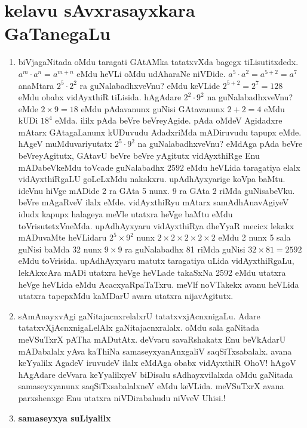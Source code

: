 \chapter{kelavu sAvxrasayxkara GaTanegaLu}

\begin{enumerate}[\rm 1)]
\item biVjagaNitada oMdu taragati GAtAMka tatatxvXda bagegx tiLisutitxdedx. $a^m\cdot a^n=a^{m+n}$ eMdu heVLi oMdu udAharaNe niVDide. $a^5\cdot a^2=a^{5+2}=a^7$ anaMtara $2^5\cdot 2^2$ ra guNalabadhxveVnu? eMdu keVLide $2^{5+2}=2^7=128$ eMdu obabx vidAyxthiR tiLisida. hAgAdare $2^2\cdot 9^2$ na guNalabadhxveVnu? eMde $2\times 9=18$ eMdu pAdavanunx guNisi GAtavanunx $2+2=4$ eMdu kUDi $18^4$ eMda. ililx pAda beVre beVreyAgide. pAda oMdeV Agidadxre mAtarx GAtagaLanunx kUDuvudu AdadxriMda mADiruvudu tapupx eMde. hAgeV muMduvariyutatx $2^5\cdot 9^2$ na guNalabadhxveVnu? eMdAga pAda beVre beVreyAgitutx, GAtavU beVre beVre yAgitutx vidAyxthiRge Enu mADabeVkeMdu toVcade guNalabadhx $2592$ eMdu heVLida taragatiya elalx vidAyxthiRgaLU goLeLxMdu nakakxru. upAdhAyxyarige koVpa baMtu. ideVnu hiVge mADide {\rm 2} ra GAta {\rm 5} nunx. {\rm 9} ra GAta {\rm 2} riMda guNisabeVku. beVre mAgaRveV ilalx eMde. vidAyxthiRyu mAtarx samAdhAnavAgiyeV idudx kapupx halageya meVle utatxra heVge baMtu eMdu toVrisutetxVneMda. upAdhAyxyaru vidAyxthiRya dheYyaR mecicx lekakx mADuvaMte heVLidaru $2^5\times 9^2$ nunx $2\times 2\times 2\times 2\times 2$ eMdu {\rm 2} nunx {\rm 5} sala guNisi baMda {\rm 32} nunx $9\times 9$ ra guNalabadhx {\rm 81} riMda guNisi $32\times 81=2592$ eMdu toVrisida. upAdhAyxyaru matutx taragatiya uLida vidAyxthiRgaLu, lekAkxcAra mADi utatxra heVge heVLade takaSxNa {\rm 2592} eMdu utatxra heVge heVLida eMdu AcacxyaRpaTaTxru. meVlf noVTakekx avanu heVLida utatxra tapepxMdu kaMDarU avara utatxra nijavAgitutx.

\item sAmAnayxvAgi gaNitajacnxrelalxrU tatatxvxjAcnxnigaLu. Adare tatatxvXjAcnxnigaLelAlx gaNitajacnxralalx. oMdu sala gaNitada meVSuTxrX pATha mADutAtx. deVvaru savaRshakatx Enu beVkAdarU mADabalalx yAva kaThiNa samaseyxyanAnxgaliV saqSiTxsabalalx. avana keYyalilx AgadeV iruvudeV ilalx eMdAga obabx vidAyxthiR OhoV! hAgoV hAgAdare deVvara keYyalilxyeV biDisalu sAdhayxvilalxda oMdu gaNitada samaseyxyanunx saqSiTxsabalalxneV eMdu keVLida. meVSuTxrX avana parxshenxge Enu utatxra niVDirabahudu niVveV Uhisi.!

\item \textbf{samaseyxya suLiyalilx}


\end{enumerate}
